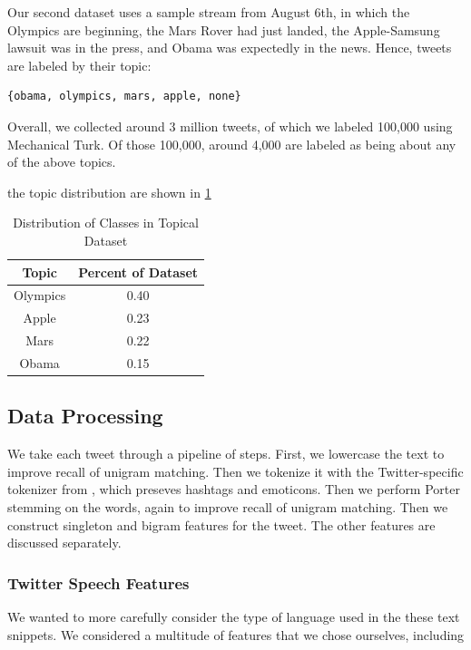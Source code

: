 \documentclass[fontsize=10pt,twocolumn,letterpaper,abstracton]{scrartcl}
\begin{document}
Our second dataset uses a sample stream from August 6th, in which the Olympics are beginning, the Mars Rover had just landed, the Apple-Samsung lawsuit was in the press, and Obama was expectedly in the news.  Hence, tweets are labeled by their topic:

\begin{verbatim}
{obama, olympics, mars, apple, none}
\end{verbatim}

Overall, we collected around 3 million tweets, of which we labeled 100,000 using Mechanical Turk.  Of those 100,000, around 4,000 are labeled as being about any of the above topics.  

the topic distribution are shown in \ref{tb:topicdist}

\begin{table}[ht]
\centering
\begin{tabular}{ c | c }
Topic & Percent of Dataset\\
\hline
Olympics & 0.40 \\
Apple & 0.23\\
Mars & 0.22\\
Obama & 0.15\\
\end{tabular}
\caption{Distribution of Classes in Topical Dataset}
\label{tb:topicdist}
\end{table}


\subsection{Data Processing}

We take each tweet through a pipeline of steps. First, we lowercase the text to improve recall of unigram matching. Then we tokenize it with the Twitter-specific tokenizer from \cite{tweetmotif}, which preseves hashtags and emoticons. Then we perform Porter stemming on the words, again to improve recall of unigram matching. Then we construct singleton and bigram features for the tweet. The other features are discussed separately.

\subsubsection{Twitter Speech Features}

We wanted to more carefully consider the type of language used in the these text snippets. We considered a multitude of features that we chose ourselves, including
\end{document}

